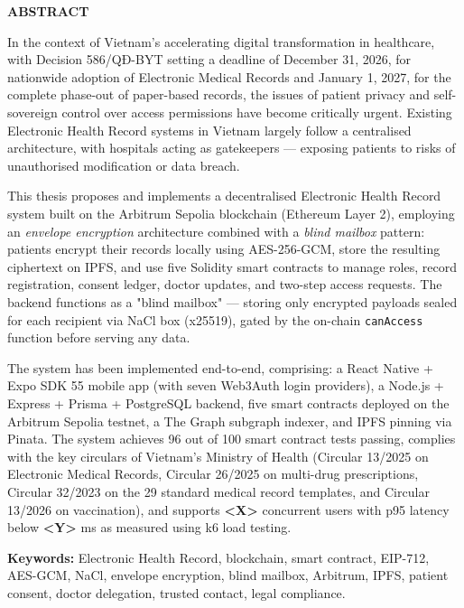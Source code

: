 \documentclass[../DoAn]{subfiles}
\begin{document}
\begin{center}
    \textbf{\Large ABSTRACT}
\end{center}

\vspace{0.5cm}


In the context of Vietnam's accelerating digital transformation in healthcare, with Decision 586/QĐ-BYT setting a deadline of December 31, 2026, for nationwide adoption of Electronic Medical Records and January 1, 2027, for the complete phase-out of paper-based records, the issues of patient privacy and self-sovereign control over access permissions have become critically urgent. Existing Electronic Health Record systems in Vietnam largely follow a centralised architecture, with hospitals acting as gatekeepers — exposing patients to risks of unauthorised modification or data breach.

This thesis proposes and implements a decentralised Electronic Health Record system built on the Arbitrum Sepolia blockchain (Ethereum Layer 2), employing an \textit{envelope encryption} architecture combined with a \textit{blind mailbox} pattern: patients encrypt their records locally using AES-256-GCM, store the resulting ciphertext on IPFS, and use five Solidity smart contracts to manage roles, record registration, consent ledger, doctor updates, and two-step access requests. The backend functions as a "blind mailbox" — storing only encrypted payloads sealed for each recipient via NaCl box (x25519), gated by the on-chain \texttt{canAccess} function before serving any data.

The system has been implemented end-to-end, comprising: a React Native + Expo SDK 55 mobile app (with seven Web3Auth login providers), a Node.js + Express + Prisma + PostgreSQL backend, five smart contracts deployed on the Arbitrum Sepolia testnet, a The Graph subgraph indexer, and IPFS pinning via Pinata. The system achieves 96 out of 100 smart contract tests passing, complies with the key circulars of Vietnam's Ministry of Health (Circular 13/2025 on Electronic Medical Records, Circular 26/2025 on multi-drug prescriptions, Circular 32/2023 on the 29 standard medical record templates, and Circular 13/2026 on vaccination), and supports \textbf{<X>} concurrent users with p95 latency below \textbf{<Y>} ms as measured using k6 load testing.

\textbf{Keywords:} Electronic Health Record, blockchain, smart contract, EIP-712, AES-GCM, NaCl, envelope encryption, blind mailbox, Arbitrum, IPFS, patient consent, doctor delegation, trusted contact, legal compliance.
\end{document}
